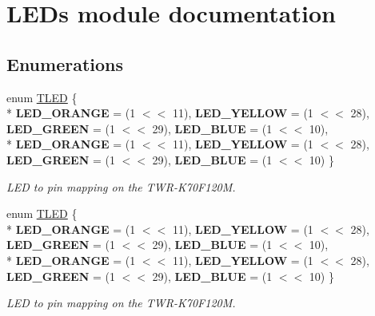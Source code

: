 \hypertarget{group___l_e_ds__module}{}\section{L\+E\+Ds module documentation}
\label{group___l_e_ds__module}
\subsection*{Enumerations}
\begin{DoxyCompactItemize}
\item 
enum \hyperlink{group___l_e_ds__module_ga833ecccaa4c55e8365e84d6c02f92ec1}{T\+L\+E\+D} \{ \\*
{\bfseries L\+E\+D\+\_\+\+O\+R\+A\+N\+G\+E} = (1 $<$$<$ 11), 
{\bfseries L\+E\+D\+\_\+\+Y\+E\+L\+L\+O\+W} = (1 $<$$<$ 28), 
{\bfseries L\+E\+D\+\_\+\+G\+R\+E\+E\+N} = (1 $<$$<$ 29), 
{\bfseries L\+E\+D\+\_\+\+B\+L\+U\+E} = (1 $<$$<$ 10), 
\\*
{\bfseries L\+E\+D\+\_\+\+O\+R\+A\+N\+G\+E} = (1 $<$$<$ 11), 
{\bfseries L\+E\+D\+\_\+\+Y\+E\+L\+L\+O\+W} = (1 $<$$<$ 28), 
{\bfseries L\+E\+D\+\_\+\+G\+R\+E\+E\+N} = (1 $<$$<$ 29), 
{\bfseries L\+E\+D\+\_\+\+B\+L\+U\+E} = (1 $<$$<$ 10)
 \}\begin{DoxyCompactList}\small\item\em L\+E\+D to pin mapping on the T\+W\+R-\/\+K70\+F120\+M. \end{DoxyCompactList}
\item 
enum \hyperlink{group___l_e_ds__module_ga833ecccaa4c55e8365e84d6c02f92ec1}{T\+L\+E\+D} \{ \\*
{\bfseries L\+E\+D\+\_\+\+O\+R\+A\+N\+G\+E} = (1 $<$$<$ 11), 
{\bfseries L\+E\+D\+\_\+\+Y\+E\+L\+L\+O\+W} = (1 $<$$<$ 28), 
{\bfseries L\+E\+D\+\_\+\+G\+R\+E\+E\+N} = (1 $<$$<$ 29), 
{\bfseries L\+E\+D\+\_\+\+B\+L\+U\+E} = (1 $<$$<$ 10), 
\\*
{\bfseries L\+E\+D\+\_\+\+O\+R\+A\+N\+G\+E} = (1 $<$$<$ 11), 
{\bfseries L\+E\+D\+\_\+\+Y\+E\+L\+L\+O\+W} = (1 $<$$<$ 28), 
{\bfseries L\+E\+D\+\_\+\+G\+R\+E\+E\+N} = (1 $<$$<$ 29), 
{\bfseries L\+E\+D\+\_\+\+B\+L\+U\+E} = (1 $<$$<$ 10)
 \}\begin{DoxyCompactList}\small\item\em L\+E\+D to pin mapping on the T\+W\+R-\/\+K70\+F120\+M. \end{DoxyCompactList}
\end{DoxyCompactItemize}

